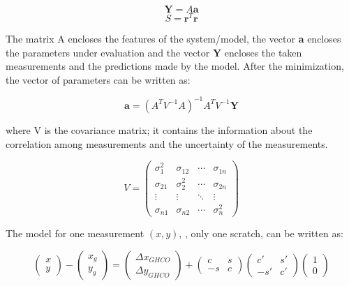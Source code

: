 \begin{equation}
\textbf{Y}= A \textbf{a}
\end{equation}
\begin{equation}
S=\textbf{r}^T\textbf{r}
\end{equation}

The matrix A encloses the features of the system/model, the vector \textbf{a} encloses the parameters under evaluation and the vector \textbf{Y} encloses the taken measurements and the predictions made by the model. After the minimization, the vector of parameters can be written as:

\begin{equation}\label{solution}
\textbf{a}=(A^TV^{-1}A)^{-1}A^TV^{-1}\textbf{Y}
\end{equation}

\noindent where V is the covariance matrix; it contains the information about the correlation among measurements and the uncertainty of the measurements.

\begin{equation}
  V=
  \begin{pmatrix}
    \sigma_1^2  & \sigma_{12}  & \cdots & \sigma_{1n} \\
    \sigma_{21} & \sigma_2^2   & \cdots & \sigma_{2n} \\
    \vdots      & \vdots       & \ddots & \vdots      \\
    \sigma_{n1} & \sigma_{n2}  & \cdots & \sigma_n^2
  \end{pmatrix}
\end{equation}

The model for one measurement $(x,y)$, \ie, only one scratch, can be written as:

\begin{equation}
\begin{pmatrix}
x\\ 
y
\end{pmatrix}-
\begin{pmatrix}
x_g\\ 
y_g
\end{pmatrix}=
\begin{pmatrix}
\Delta x_{GHCO}\\ 
\Delta y_{GHCO}
\end{pmatrix}
+
\begin{pmatrix}
c  & s\\ 
-s & c
\end{pmatrix}
\begin{pmatrix}
c' & s' \\ 
-s'& c' 
\end{pmatrix}
\begin{pmatrix}
1\\ 
0
\end{pmatrix}
\end{equation}


